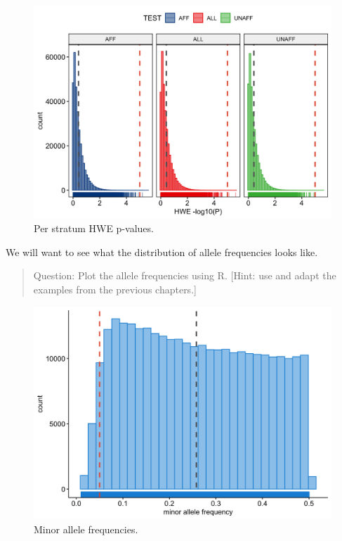 \documentclass[
]{book}
\begin{document}
\begin{figure}[H]

{\centering \includegraphics[width=0.85\linewidth]{img/_gwas_dummy/show-hwe-gwas} 

}

\caption{Per stratum HWE p-values.}\label{fig:unnamed-chunk-2}
\end{figure}

We will want to see what the distribution of allele frequencies looks like.

\begin{quote}
Question: Plot the allele frequencies using R. {[}Hint: use and adapt the examples from the previous chapters.{]}
\end{quote}

\begin{figure}[H]

{\centering \includegraphics[width=0.85\linewidth]{img/_gwas_dummy/show-freq-gwas} 

}

\caption{Minor allele frequencies.}\label{fig:unnamed-chunk-3}
\end{figure}
\end{document}
